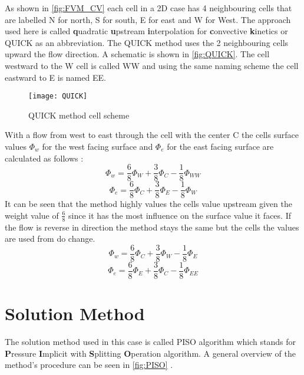 \documentclass[../thesis.tex]{subfiles}
\begin{document}
As shown in \autoref{fig:FVM_CV} each cell in a 2D case has 4 neighbouring cells that are labelled N for north, S for south, E for east and W for West. The approach used here is called \textbf{q}uadratic \textbf{u}pstream \textbf{i}nterpolation for \textbf{c}onvective \textbf{k}inetics \cite{versteeg2007introduction} or QUICK as an abbreviation. The QUICK method uses the 2 neighbouring cells upward the flow direction. A schematic is shown in \autoref{fig:QUICK}. The cell westward to the W cell is called WW and using the same naming scheme the cell eastward to E is named EE.
\begin{figure}[htbp]
	\centering
	\texttt{[image: QUICK]}
	\caption{QUICK method cell scheme}
	\label{fig:QUICK}
\end{figure}
With a flow from west to east through the cell with the center C the cells surface values $\Phi_w$ for the west facing surface and $\Phi_e$ for the east facing surface are calculated as follows \cite{versteeg2007introduction}:
\begin{equation}
	\Phi_w = \dfrac{6}{8} \Phi_W + \dfrac{3}{8} \Phi_C - \dfrac{1}{8} \Phi_{WW}
\end{equation}
\begin{equation}
	\Phi_e = \dfrac{6}{8} \Phi_C + \dfrac{3}{8} \Phi_E - \dfrac{1}{8} \Phi_{W}
\end{equation}
It can be seen that the method highly values the cells value upstream given the weight value of $\frac{6}{8}$ since it has the most influence on the surface value it faces. If the flow is reverse in direction the method stays the same but the cells the values are used from do change.
\begin{equation}
	\Phi_w = \dfrac{6}{8} \Phi_C + \dfrac{3}{8} \Phi_W - \dfrac{1}{8} \Phi_{E}
\end{equation}
\begin{equation}
	\Phi_e = \dfrac{6}{8} \Phi_E + \dfrac{3}{8} \Phi_C - \dfrac{1}{8} \Phi_{EE}
\end{equation}

\section{Solution Method}
\label{sec:sol_method}

The solution method used in this case is called PISO algorithm which stands for \textbf{P}ressure \textbf{I}mplicit with \textbf{S}plitting \textbf{O}peration algorithm. A general overview of the method's procedure can be seen in \autoref{fig:PISO} \cite{versteeg2007introduction}.
\end{document}
